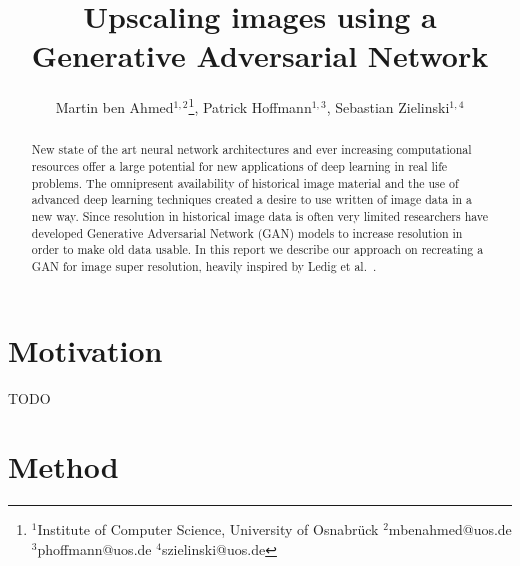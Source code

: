 \documentclass[11pt,twocolumn,twoside,paper=a4]{IEEEtran}
\begin{document}
\title{\vspace{0.2in}\sc Upscaling images using a Generative Adversarial Network}
\author{Martin ben Ahmed$^{1,2}$\thanks{$^1$Institute of Computer Science, University of Osnabrück $^2$mbenahmed@uos.de $^3$phoffmann@uos.de $^4$szielinski@uos.de}, Patrick Hoffmann$^{1,3}$, Sebastian Zielinski$^{1,4}$}

\maketitle
\thispagestyle{fancy}
\begin{abstract}
New state of the art neural network architectures and ever increasing computational resources
offer a large potential for new applications of deep learning in real life problems. The omnipresent
availability of historical image material and the use of advanced deep learning techniques created a desire
to use written of image data in a new way. Since resolution in historical image data is often very limited
researchers have developed Generative Adversarial Network (GAN) models to increase resolution in order to make old
data usable. In this report we describe our approach on recreating a GAN for image super resolution, heavily
inspired by Ledig et al.~\cite{DBLP:journals/corr/LedigTHCATTWS16}.
\end{abstract}

\section{Motivation}
TODO

\section{Method}
\end{document}
